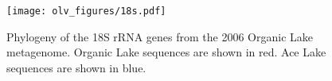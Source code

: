 \begin{landscape}
\begin{centering}
\begin{figure}
\texttt{[image: olv\_figures/18s.pdf]}
\caption[Phylogeny of the 18S rRNA genes from the 2006 Organic Lake metagenome]{Phylogeny of the 18S rRNA genes from the 2006 Organic Lake metagenome. 
Organic Lake sequences are shown in red.
Ace Lake sequences are shown in blue.
}
\label{fig:18s}

\end{figure}
\end{centering}
\end{landscape}
